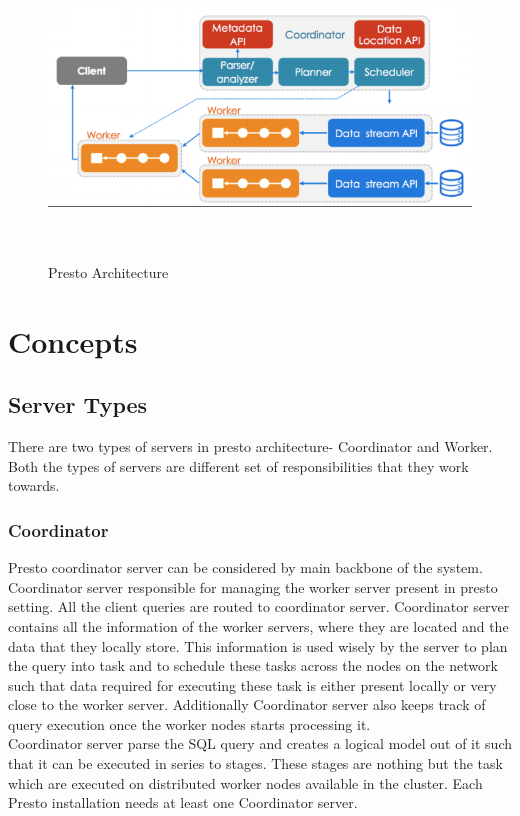 \begin{figure}
\includegraphics[height=8cm, width=15cm,keepaspectratio]{presto-architecture}
\caption{Presto Architecture}
\end{figure}


\section{Concepts}
\subsection{Server Types}
There are two types of servers in presto architecture- Coordinator and Worker. Both the types of servers are different set of responsibilities that they work towards. 
\subsubsection{Coordinator}
Presto coordinator server can be considered by main backbone of the system. Coordinator server responsible for managing the worker server present in presto setting. All the client queries are routed to coordinator server. Coordinator server contains all the information of the worker servers, where they are located and the data that they locally store. This information is used wisely by the server to plan the query into task and to schedule these tasks across the nodes on the network such that data required for executing these task is either present locally or very close to the worker server. Additionally Coordinator server also keeps track of query execution once the worker nodes starts processing it.\\
Coordinator server parse the SQL query and creates a logical model out of it such that it can be executed in series to stages. These stages are nothing but the task which are executed on distributed worker nodes available in the cluster. Each Presto installation needs at least one Coordinator server.

